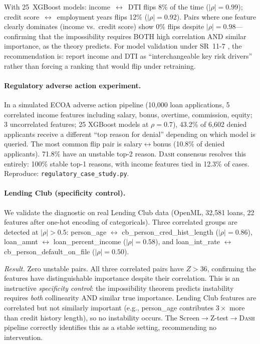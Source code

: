 \documentclass{article}
\newcommand{\DASH}{\textsc{Dash}}
\begin{document}
\begin{sloppypar}
With 25~XGBoost models: income~$\leftrightarrow$~DTI flips 8\%
of the time ($|\rho| = 0.99$); credit score~$\leftrightarrow$~employment
years flips 12\% ($|\rho| = 0.92$). Pairs where one feature clearly
dominates (income vs.\ credit score) show 0\% flips despite
$|\rho| = 0.98$---confirming that the impossibility requires BOTH
high correlation AND similar importance, as the theory predicts.
For model validation under SR~11-7 \citep{occ2011sr117}, the recommendation is:
report income and DTI as ``interchangeable key risk drivers'' rather than forcing
a ranking that would flip under retraining.
\end{sloppypar}

\paragraph{Regulatory adverse action experiment.}
\begin{sloppypar}
In a simulated ECOA adverse action pipeline (10{,}000 loan applications, 5 correlated
income features including salary, bonus, overtime, commission, equity; 3 uncorrelated
features; 25 XGBoost models at $\rho{=}0.7$), 43.2\% of 6{,}602 denied applicants
receive a different ``top reason for denial'' depending on which model is queried.
The most common flip pair is salary$\leftrightarrow$bonus (10.8\% of denied
applicants). 71.8\% have an unstable top-2 reason. \DASH{} consensus resolves this
entirely: 100\% stable top-1 reasons, with income features tied in 12.3\% of cases.
Reproduce: \texttt{regulatory\_case\_study.py}.
\end{sloppypar}

\paragraph{Lending Club (specificity control).}
We validate the diagnostic on real Lending Club data (OpenML,
32{,}581 loans, 22 features after one-hot encoding of categoricals).
Three correlated groups are detected at $|\rho| > 0.5$:
person\_age $\leftrightarrow$ cb\_person\_cred\_hist\_length
($|\rho| = 0.86$), loan\_amnt $\leftrightarrow$
loan\_percent\_income ($|\rho| = 0.58$), and loan\_int\_rate
$\leftrightarrow$ cb\_person\_default\_on\_file ($|\rho| = 0.50$).

\emph{Result.}
Zero unstable pairs. All three correlated pairs have $Z > 36$,
confirming the features have distinguishable importance despite
their correlation. This is an instructive \emph{specificity control}:
the impossibility theorem predicts instability requires \emph{both}
collinearity AND similar true importance. Lending Club features are
correlated but not similarly important (e.g., person\_age contributes
$3\times$ more than credit history length), so no instability occurs.
The Screen$\to$Z-test$\to$\DASH{} pipeline correctly identifies this as a
stable setting, recommending no intervention.
\end{document}
